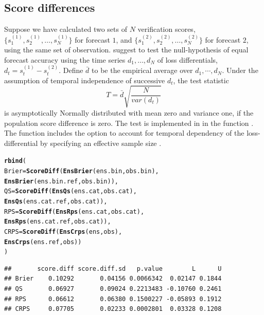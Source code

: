 \documentclass[article]{jss}\usepackage{graphicx, color}
\makeatletter
\newcommand{\hlfunctioncall}[1]{\textcolor[rgb]{0,0.501960784313725,0.752941176470588}{\textbf{#1}}}%
\newenvironment{kframe}{%
 \def\at@end@of@kframe{}%
 \ifinner\ifhmode%
  \def\at@end@of@kframe{\end{minipage}}%
  \begin{minipage}{\columnwidth}%
 \fi\fi%
 \def\FrameCommand##1{\hskip\@totalleftmargin \hskip-\fboxsep
 \colorbox{shadecolor}{##1}\hskip-\fboxsep
     \hskip-\linewidth \hskip-\@totalleftmargin \hskip\columnwidth}%
 \MakeFramed {\advance\hsize-\width
   \@totalleftmargin\z@ \linewidth\hsize
   \@setminipage}}%
 {\par\unskip\endMakeFramed%
 \at@end@of@kframe}
\newenvironment{knitrout}{}{} %
\makeatother
\begin{document}
\subsection{Score differences}

Suppose we have calculated two sets of $N$ verification scores, $\{s^{(1)}_1, s^{(1)}_2, \dots, s^{(1)}_N\}$ for forecast $1$, and $\{s^{(2)}_1, s^{(2)}_2, \dots, s^{(2)}_N\}$ for forecast $2$, using the same set of observation.
\citet{diebold1995comparing} suggest to test the null-hypothesis of equal forecast accuracy using the time series $d_1, \dots, d_N$ of loss differentials, $d_t = s^{(1)}_t - s^{(2)}_t$. 
Define $\bar{d}$ to be the empirical average over $d_1,\cdots, d_N$.
Under the assumption of temporal independence of successive $d_t$, the test statistic 
%
\begin{equation}
T = \bar{d}\sqrt{\frac{N}{var(d_t)}}
\end{equation}
%
is asymptotically Normally distributed with mean zero and variance one, if the population score difference is zero.
The test is implemented in  in the function .
The function includes the option to account for temporal dependency of the loss-differential by specifying an effective sample size .
%
\begin{knitrout}
\color{fgcolor}\begin{kframe}
\begin{alltt}
\hlfunctioncall{rbind}(
  Brier = \hlfunctioncall{ScoreDiff}(\hlfunctioncall{EnsBrier}(ens.bin,     obs.bin), 
                    \hlfunctioncall{EnsBrier}(ens.bin.ref, obs.bin)),
  QS    = \hlfunctioncall{ScoreDiff}(\hlfunctioncall{EnsQs}(   ens.cat,     obs.cat),    
                    \hlfunctioncall{EnsQs}(   ens.cat.ref, obs.cat)),
  RPS   = \hlfunctioncall{ScoreDiff}(\hlfunctioncall{EnsRps}(  ens.cat,     obs.cat),   
                    \hlfunctioncall{EnsRps}(  ens.cat.ref, obs.cat)),
  CRPS  = \hlfunctioncall{ScoreDiff}(\hlfunctioncall{EnsCrps}( ens,         obs),          
                    \hlfunctioncall{EnsCrps}( ens.ref,     obs))
)
\end{alltt}
\begin{verbatim}
##       score.diff score.diff.sd   p.value        L      U
## Brier    0.10292       0.04156 0.0066342  0.02147 0.1844
## QS       0.06927       0.09024 0.2213483 -0.10760 0.2461
## RPS      0.06612       0.06380 0.1500227 -0.05893 0.1912
## CRPS     0.07705       0.02233 0.0002801  0.03328 0.1208
\end{verbatim}
\end{kframe}
\end{knitrout}
\end{document}
